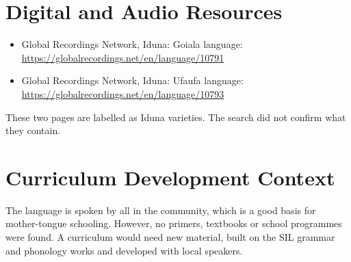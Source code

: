 \documentclass[12pt]{article}
\begin{document}
\section{Digital and Audio Resources}
\begin{itemize}
\item Global Recordings Network, Iduna: Goiala language: \url{https://globalrecordings.net/en/language/10791}
\item Global Recordings Network, Iduna: Ufaufa language: \url{https://globalrecordings.net/en/language/10793}
\end{itemize}
These two pages are labelled as Iduna varieties. The search did not confirm what they contain.

\section{Curriculum Development Context}
The language is spoken by all in the community, which is a good basis for mother-tongue schooling. However, no primers, textbooks or school programmes were found. A curriculum would need new material, built on the SIL grammar and phonology works and developed with local speakers.
\end{document}
